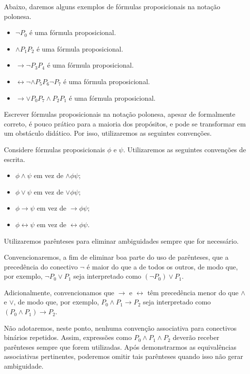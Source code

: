 \begin{example}\label{ex:formulasProposicionais}Abaixo, daremos alguns exemplos de fórmulas proposicionais na notação polonesa.
    \begin{itemize}
        \item $\neg P_0$ é uma fórmula proposicional.
        \item $\wedge P_1 P_2$ é uma fórmula proposicional.
        \item $\rightarrow \neg P_3 P_4$ é uma fórmula proposicional.
        \item $\leftrightarrow \neg \wedge P_5 P_6 \neg P_7$ é uma fórmula proposicional.
        \item $\rightarrow \vee P_0 P_7 \wedge P_2 P_1$ é uma fórmula proposicional.
    \end{itemize}
\end{example}
Escrever fórmulas proposicionais na notação polonesa, apesar de formalmente correto, é pouco prático para a maioria dos propósitos, e pode se transformar em um obstáculo didático.
Por isso, utilizaremos as seguintes convenções.
\begin{convention}\label{conv:convencoesEscritaPC}Considere fórmulas proposicionais $\phi$ e $\psi$.
Utilizaremos as seguintes convenções de escrita.
\begin{itemize}
    \item $\phi \wedge \psi$ em vez de ${\wedge}\phi\psi$;
    \item $\phi \vee \psi$ em vez de ${\vee}\phi\psi$;
    \item $\phi \rightarrow \psi$ em vez de ${\rightarrow}\phi\psi$;
    \item $\phi \leftrightarrow \psi$ em vez de ${\leftrightarrow}\phi\psi$.
\end{itemize}
Utilizaremos parênteses para eliminar ambiguidades sempre que for necessário.

Convencionaremos, a fim de eliminar boa parte do uso de parênteses, que a precedência do conectivo $\neg$ é maior do que a de todos os outros, de modo que, por exemplo, $\neg P_0 \vee P_1$ seja interpretado como $(\neg P_0) \vee P_1$.

Adicionalmente, convencionamos que $\rightarrow$ e $\leftrightarrow$ têm precedência menor do que $\wedge$ e $\vee$, de modo que, por exemplo, $P_0 \wedge P_1 \rightarrow P_2$ seja interpretado como $(P_0 \wedge P_1) \rightarrow P_2$.
\end{convention}

Não adotaremos, neste ponto, nenhuma convenção associativa para conectivos binários repetidos.
Assim, expressões como $P_0\wedge P_1\wedge P_2$ deverão receber parênteses sempre que forem utilizadas.
Após demonstrarmos as equivalências associativas pertinentes, poderemos omitir tais parênteses quando isso não gerar ambiguidade.

